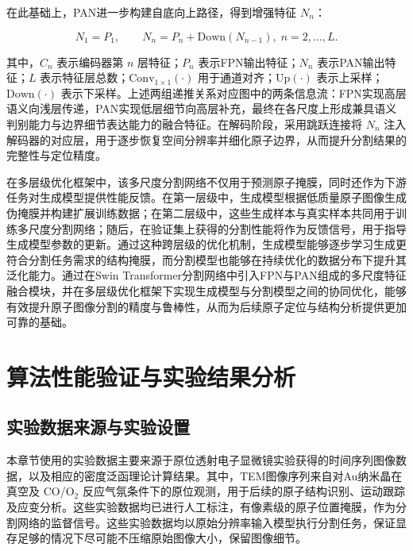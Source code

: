 在此基础上，PAN进一步构建自底向上路径，得到增强特征 $N_n$：

\begin{equation}
N_1 = P_1, \qquad
N_n = P_n + \mathrm{Down}(N_{n-1}), \; n=2,\dots,L.
\end{equation}

其中，$C_n$ 表示编码器第 $n$ 层特征；$P_n$ 表示FPN输出特征；$N_n$ 表示PAN输出特征；$L$ 表示特征层总数；$\mathrm{Conv}_{1\times1}(\cdot)$ 用于通道对齐；$\mathrm{Up}(\cdot)$ 表示上采样；$\mathrm{Down}(\cdot)$ 表示下采样。上述两组递推关系对应图中的两条信息流：FPN实现高层语义向浅层传递，PAN实现低层细节向高层补充，最终在各尺度上形成兼具语义判别能力与边界细节表达能力的融合特征。在解码阶段，采用跳跃连接将 $N_n$ 注入解码器的对应层，用于逐步恢复空间分辨率并细化原子边界，从而提升分割结果的完整性与定位精度。

在多层级优化框架中，该多尺度分割网络不仅用于预测原子掩膜，同时还作为下游任务对生成模型提供性能反馈。在第一层级中，生成模型根据低质量原子图像生成伪掩膜并构建扩展训练数据；在第二层级中，这些生成样本与真实样本共同用于训练多尺度分割网络；随后，在验证集上获得的分割性能将作为反馈信号，用于指导生成模型参数的更新。通过这种跨层级的优化机制，生成模型能够逐步学习生成更符合分割任务需求的结构掩膜，而分割模型也能够在持续优化的数据分布下提升其泛化能力。通过在Swin Transformer分割网络中引入FPN与PAN组成的多尺度特征融合模块，并在多层级优化框架下实现生成模型与分割模型之间的协同优化，能够有效提升原子图像分割的精度与鲁棒性，从而为后续原子定位与结构分析提供更加可靠的基础。

\section{算法性能验证与实验结果分析}
\subsection{实验数据来源与实验设置}
本章节使用的实验数据主要来源于原位透射电子显微镜实验获得的时间序列图像数据，以及相应的密度泛函理论计算结果。其中，TEM图像序列来自对Au纳米晶在真空及 CO/O$_2$ 反应气氛条件下的原位观测，用于后续的原子结构识别、运动跟踪及应变分析。这些实验数据均已进行人工标注，有像素级的原子位置掩膜，作为分割网络的监督信号。这些实验数据均以原始分辨率输入模型执行分割任务，保证显存足够的情况下尽可能不压缩原始图像大小，保留图像细节。

